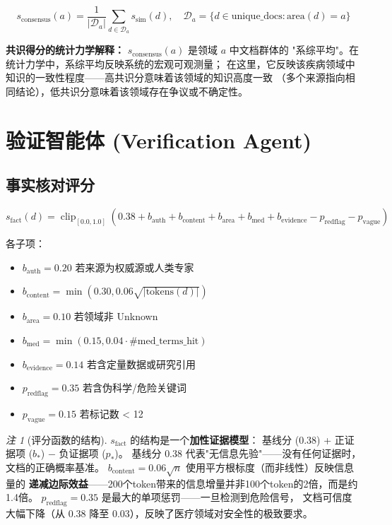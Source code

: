 \documentclass[11pt,a4paper]{ctexart}
\theoremstyle{remark}
\newtheorem{remark}{注}[section]
\DeclareMathOperator{\clip}{clip}
\begin{document}
\begin{equation}
s_{\text{consensus}}(a) = \frac{1}{|\mathcal{D}_a|}\sum_{d \in \mathcal{D}_a} s_{\text{sim}}(d), \quad \mathcal{D}_a = \{d \in \text{unique\_docs}: \text{area}(d) = a\}
\end{equation}

\textbf{共识得分的统计力学解释：} $s_{\text{consensus}}(a)$ 是领域 $a$ 中文档群体的
"系综平均"。在统计力学中，系综平均反映系统的宏观可观测量；
在这里，它反映该疾病领域中知识的一致性程度——高共识分意味着该领域的知识高度一致
（多个来源指向相同结论），低共识分意味着该领域存在争议或不确定性。

\section{验证智能体 (Verification Agent)}

\subsection{事实核对评分}

\begin{equation}
s_{\text{fact}}(d) = \clip_{[0.0, 1.0]}\left(0.38 + b_{\text{auth}} + b_{\text{content}} + b_{\text{area}} + b_{\text{med}} + b_{\text{evidence}} - p_{\text{redflag}} - p_{\text{vague}}\right)
\end{equation}

各子项：
\begin{itemize}[nosep]
\item $b_{\text{auth}} = 0.20$ 若来源为权威源或人类专家
\item $b_{\text{content}} = \min(0.30, 0.06\sqrt{|\text{tokens}(d)|})$
\item $b_{\text{area}} = 0.10$ 若领域非 Unknown
\item $b_{\text{med}} = \min(0.15, 0.04 \cdot \#\text{med\_terms\_hit})$
\item $b_{\text{evidence}} = 0.14$ 若含定量数据或研究引用
\item $p_{\text{redflag}} = 0.35$ 若含伪科学/危险关键词
\item $p_{\text{vague}} = 0.15$ 若标记数 < 12
\end{itemize}

\begin{remark}[评分函数的结构]
$s_{\text{fact}}$ 的结构是一个\textbf{加性证据模型}：
基线分 ($0.38$) + 正证据项 ($b_*$) $-$ 负证据项 ($p_*$)。
基线分 $0.38$ 代表"无信息先验"——没有任何证据时，文档的正确概率基准。
$b_{\text{content}} = 0.06\sqrt{n}$ 使用平方根标度（而非线性）反映信息量的
\textbf{递减边际效益}——200个token带来的信息增量并非100个token的2倍，而是约1.4倍。
$p_{\text{redflag}} = 0.35$ 是最大的单项惩罚——一旦检测到危险信号，
文档可信度大幅下降（从 0.38 降至 0.03），反映了医疗领域对安全性的极致要求。
\end{remark}
\end{document}
